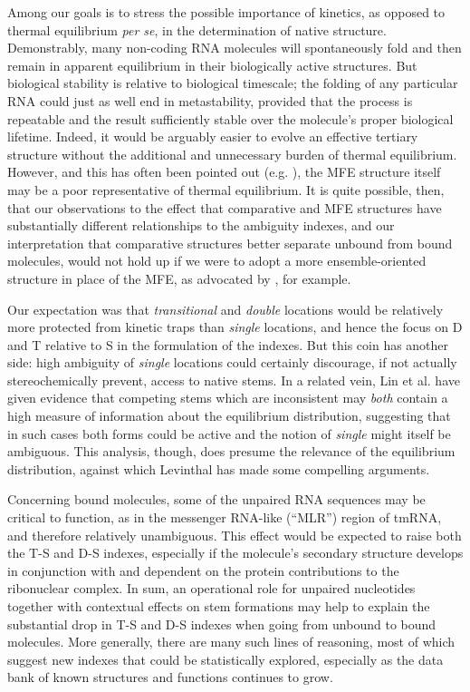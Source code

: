 \documentclass[10pt,letterpaper]{article}
\begin{document}
Among our goals is to stress the possible importance of kinetics, as opposed to thermal equilibrium {\em per se}, in the determination of native structure. Demonstrably, many non-coding RNA molecules will spontaneously fold and then remain in apparent equilibrium in their biologically active structures. 
But biological stability is relative to biological timescale; the folding of any particular RNA could just as well end in metastability, provided that the process is repeatable and the result sufficiently stable over the molecule's proper biological lifetime. Indeed, it would be arguably easier to evolve an effective tertiary structure without the additional and unnecessary burden of thermal equilibrium. 
However, and this has often been pointed out (e.g. \cite{Ding2003-sv, Mathews2006-th}), the MFE structure itself may be a poor representative of thermal equilibrium. It is quite possible, then, that our observations to the effect that comparative and MFE structures have substantially different relationships to the ambiguity indexes, and our interpretation that comparative structures better separate unbound from bound molecules, would not hold up if we were to adopt a more ensemble-oriented structure in place of the MFE, as advocated by \cite{Ding2005-br}, for example.

Our expectation was that {\em transitional} and {\em double} locations would be relatively more protected from kinetic traps than {\em single} locations, and hence the focus on D and T relative to S in the formulation of the indexes. But this coin has another side: high ambiguity of {\em single} locations could certainly discourage, if not actually stereochemically prevent, access to native stems. In a related vein, Lin et al. \cite{Lin2018-xl} have given evidence that competing stems which are inconsistent may {\em both} contain a high measure of information about the equilibrium distribution, suggesting that in such cases both forms could be active and the notion of {\em single} might itself be ambiguous. This analysis, though, does presume the relevance of the equilibrium distribution, against which Levinthal has made some compelling arguments.

Concerning bound molecules, some of the unpaired RNA sequences may be critical to function, as in the 
messenger RNA-like (``MLR'') region of tmRNA, and therefore relatively unambiguous. 
This effect would be expected to raise both the T-S and D-S indexes, especially if the molecule's secondary structure develops in conjunction with and dependent on the protein contributions to the ribonuclear complex. In sum, 
an operational role for unpaired nucleotides together with contextual effects on stem formations may help to explain the substantial drop in T-S and D-S indexes when going from unbound to bound molecules. More generally, 
there are many such lines of reasoning, most of which suggest new indexes that could be statistically explored, especially as the data bank of known structures and functions continues to grow.
\end{document}
